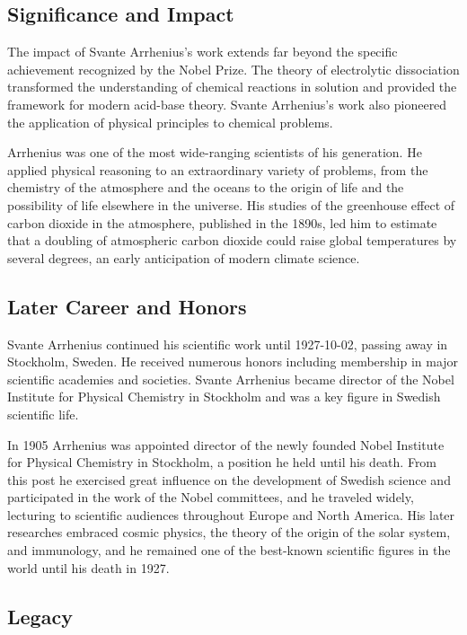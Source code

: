 \subsection*{Significance and Impact}

The impact of Svante Arrhenius's work extends far beyond the specific achievement recognized by the Nobel Prize.
The theory of electrolytic dissociation transformed the understanding of chemical reactions in solution and provided the framework for modern acid-base theory. Svante Arrhenius's work also pioneered the application of physical principles to chemical problems.

Arrhenius was one of the most wide-ranging scientists of his generation. He applied physical reasoning to an extraordinary variety of problems, from the chemistry of the atmosphere and the oceans to the origin of life and the possibility of life elsewhere in the universe. His studies of the greenhouse effect of carbon dioxide in the atmosphere, published in the 1890s, led him to estimate that a doubling of atmospheric carbon dioxide could raise global temperatures by several degrees, an early anticipation of modern climate science.

\subsection*{Later Career and Honors}

Svante Arrhenius continued his scientific work until 1927-10-02, passing away in Stockholm, Sweden.
He received numerous honors including membership in major scientific academies and societies.
Svante Arrhenius became director of the Nobel Institute for Physical Chemistry in Stockholm and was a key figure in Swedish scientific life.

In 1905 Arrhenius was appointed director of the newly founded Nobel Institute for Physical Chemistry in Stockholm, a position he held until his death. From this post he exercised great influence on the development of Swedish science and participated in the work of the Nobel committees, and he traveled widely, lecturing to scientific audiences throughout Europe and North America. His later researches embraced cosmic physics, the theory of the origin of the solar system, and immunology, and he remained one of the best-known scientific figures in the world until his death in 1927.

\subsection*{Legacy}

